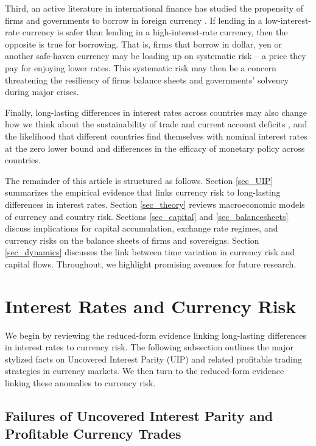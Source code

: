 \documentclass{ar-1col}
\begin{document}
Third, an active literature in international finance has studied the propensity of firms and governments to borrow in foreign currency \citep{cespedes2004balance, du2016sovereign}. If lending in a low-interest-rate currency is safer than lending in a high-interest-rate currency, then the opposite is true for borrowing. That is, firms that borrow in dollar, yen or another safe-haven currency may be loading up on systematic risk -- a price they pay for enjoying lower rates. This systematic risk may then be a concern threatening the resiliency of firms balance sheets and governments' solvency during major crises.

Finally, long-lasting differences in interest rates across countries may also change how we think about the sustainability of trade and current account deficits \citep{GourinchasRey2007}, and the likelihood that different countries find themselves with nominal interest rates at the zero lower bound and differences in the efficacy of monetary policy across countries.

The remainder of this article is structured as follows. Section \ref{sec_UIP} summarizes the empirical evidence that links currency risk to long-lasting differences in interest rates. Section \ref{sec_theory} reviews macroeconomic models of currency and country risk. Sections \ref{sec_capital} and \ref{sec_balancesheets} discuss implications for capital accumulation, exchange rate regimes, and currency risks on the balance sheets of firms and sovereigns.  Section \ref{sec_dynamics} discusses the link between time variation in currency risk and capital flows. Throughout, we highlight promising avenues for future research.


\section{Interest Rates and Currency Risk \label{sec_UIP}}

We begin by reviewing the reduced-form evidence linking long-lasting differences in interest rates to currency risk. The following subsection outlines the major stylized facts on Uncovered Interest Parity (UIP) and related profitable trading strategies in currency markets. We then turn to the reduced-form evidence linking these anomalies to currency risk. 

\subsection{Failures of
  Uncovered Interest Parity and Profitable Currency Trades }
\end{document}
